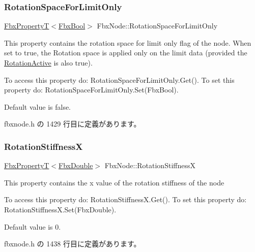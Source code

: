 \subsubsection{\texorpdfstring{Rotation\+Space\+For\+Limit\+Only}{RotationSpaceForLimitOnly}}
{\footnotesize\ttfamily \hyperlink{class_fbx_property_t}{Fbx\+PropertyT}$<$\hyperlink{fbxtypes_8h_a92e0562b2fe33e76a242f498b362262e}{Fbx\+Bool}$>$ Fbx\+Node\+::\+Rotation\+Space\+For\+Limit\+Only}

This property contains the rotation space for limit only flag of the node. When set to {\ttfamily true}, the Rotation space is applied only on the limit data (provided the \hyperlink{class_fbx_node_aaa4a7a57dc28f7979c04c096bd94b752}{Rotation\+Active} is also {\ttfamily true}).

To access this property do\+: Rotation\+Space\+For\+Limit\+Only.\+Get(). To set this property do\+: Rotation\+Space\+For\+Limit\+Only.\+Set(\+Fbx\+Bool).

Default value is false. 

 fbxnode.\+h の 1429 行目に定義があります。

\mbox{\label{class_fbx_node_afb4e18a55373bff597d3827026e049d1}} 
\subsubsection{\texorpdfstring{Rotation\+StiffnessX}{RotationStiffnessX}}
{\footnotesize\ttfamily \hyperlink{class_fbx_property_t}{Fbx\+PropertyT}$<$\hyperlink{fbxtypes_8h_a171e72a1c46fc15c1a6c9c31948c1c5b}{Fbx\+Double}$>$ Fbx\+Node\+::\+Rotation\+StiffnessX}

This property contains the x value of the rotation stiffness of the node

To access this property do\+: Rotation\+Stiffness\+X.\+Get(). To set this property do\+: Rotation\+Stiffness\+X.\+Set(\+Fbx\+Double).

Default value is 0. 

 fbxnode.\+h の 1438 行目に定義があります。

\mbox{\label{class_fbx_node_a95e74933f4fcdbf6da893462ade3181f}} 
